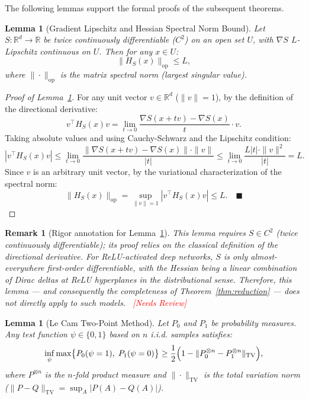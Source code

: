 \documentclass[12pt,a4paper]{article}
\newtheorem{lemma}[theorem]{Lemma}
\newtheorem{remark}[theorem]{Remark}
\newcommand{\critical}{\textcolor{red}{\small\textsf{[Needs Review]}}}
\newcommand{\R}{\mathbb{R}}
\newcommand{\TV}{\mathrm{TV}}
\newcommand{\op}{\mathrm{op}}
\begin{document}

The following lemmas support the formal proofs of the subsequent theorems.

\begin{lemma}[Gradient Lipschitz and Hessian Spectral Norm Bound]
\label{lem:hessian-bound}
Let $S: \R^d \to \R$ be twice continuously differentiable ($C^2$) on an open set $U$, with $\nabla S$ $L$-Lipschitz continuous on $U$. Then for any $x \in U$:
\[
\|H_S(x)\|_{\op} \leq L,
\]
where $\|\cdot\|_{\op}$ is the matrix spectral norm (largest singular value).
\end{lemma}

\begin{proof}[Proof of Lemma~\ref{lem:hessian-bound}]
For any unit vector $v \in \R^d$ ($\|v\| = 1$), by the definition of the directional derivative:
\[
v^\top H_S(x) v = \lim_{t \to 0} \frac{\nabla S(x+tv) - \nabla S(x)}{t} \cdot v.
\]
Taking absolute values and using Cauchy-Schwarz and the Lipschitz condition:
\[
|v^\top H_S(x) v| \leq \lim_{t \to 0} \frac{\|\nabla S(x+tv) - \nabla S(x)\| \cdot \|v\|}{|t|}
                 \leq \lim_{t \to 0} \frac{L |t| \cdot \|v\|^2}{|t|} = L.
\]
Since $v$ is an arbitrary unit vector, by the variational characterization of the spectral norm:
\[
\|H_S(x)\|_{\op} = \sup_{\|v\|=1} |v^\top H_S(x) v| \leq L.
\quad\blacksquare
\]
\end{proof}

\begin{remark}[Rigor annotation for Lemma~\ref{lem:hessian-bound}]
This lemma requires $S \in C^2$ (twice continuously differentiable); its proof relies on the classical definition of the directional derivative. For ReLU-activated deep networks, $S$ is only almost-everywhere first-order differentiable, with the Hessian being a linear combination of Dirac deltas at ReLU hyperplanes in the distributional sense. Therefore, this lemma --- and consequently the completeness of Theorem~\ref{thm:reduction} --- does not directly apply to such models. ~\critical
\end{remark}

\begin{lemma}[Le Cam Two-Point Method]
\label{lem:lecam}
Let $P_0$ and $P_1$ be probability measures. Any test function $\psi \in \{0,1\}$ based on $n$ i.i.d. samples satisfies:
\[
\inf_{\psi} \max\bigl\{ P_0(\psi=1),\; P_1(\psi=0) \bigr\}
   \geq \frac12 \Bigl(1 - \|P_0^{\otimes n} - P_1^{\otimes n}\|_{\TV}\Bigr),
\]
where $P^{\otimes n}$ is the $n$-fold product measure and $\|\cdot\|_{\TV}$ is the total variation norm ($\|P-Q\|_{\TV} = \sup_{A} |P(A)-Q(A)|$).
\end{lemma}
\end{document}
